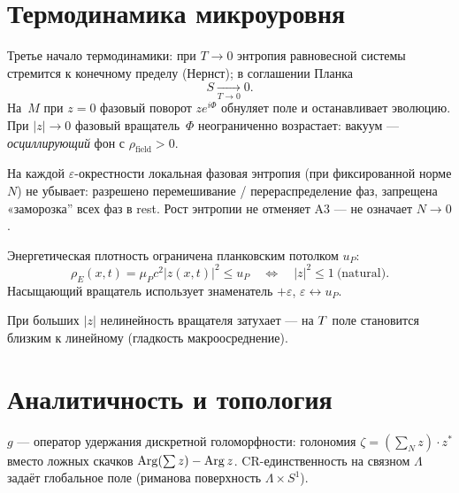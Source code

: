 \section{Термодинамика микроуровня}

\begin{axiom}
\label{ax:A5}
Третье начало термодинамики: при $T\to 0$ энтропия равновесной системы стремится к конечному
пределу (Нернст); в соглашении Планка
\[
  S \xrightarrow[T\to 0]{} 0.
\]
На~$M$ при $z=0$ фазовый поворот $z e^{i\Phi}$ обнуляет поле
и останавливает эволюцию.
При $|z|\to 0$ фазовый вращатель~$\Phi$ неограниченно возрастает: вакуум --- \emph{осциллирующий} фон
с $\rho_{\mathrm{field}}>0$.
\end{axiom}

\begin{axiom}
\label{ax:A6}
На каждой $\varepsilon$-окрестности локальная фазовая энтропия (при фиксированной норме $N$)
не убывает: разрешено перемешивание / перераспределение фаз, запрещена «заморозка'' всех фаз в rest.
Рост энтропии не отменяет A3 --- не означает $N\to 0$.
\end{axiom}

\begin{axiom}
\label{ax:A7}
Энергетическая плотность ограничена планковским потолком $u_P$:
\[
  \rho_E(x,t)=\mu_P c^2 |z(x,t)|^2 \le u_P
  \quad\Leftrightarrow\quad
  |z|^2 \le 1 \ \text{(natural)}.
\]
Насыщающий вращатель использует знаменатель $+\varepsilon$, $\varepsilon\leftrightarrow u_P$.
\end{axiom}

\begin{axiom}
\label{ax:A8}
При больших $|z|$ нелинейность вращателя затухает --- на $T$ поле становится близким к линейному
(гладкость макроосреднение).
\end{axiom}

\section{Аналитичность и топология}

\begin{axiom}
\label{ax:A9}
$g$ --- оператор удержания дискретной голоморфности: голономия $\zeta=(\sum_N z)\cdot z^*$
вместо ложных скачков $\operatorname{Arg}(\sum z)-\operatorname{Arg} z$.
CR-единственность на связном $\Lambda$ задаёт глобальное поле (риманова поверхность $\Lambda\times S^1$).
\end{axiom}

